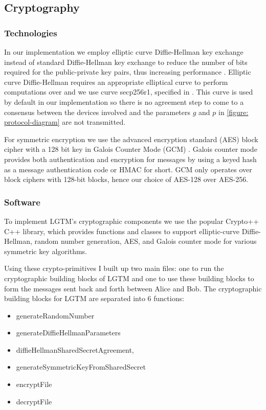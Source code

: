 \documentclass[12pt]{report}
\begin{document}
\subsection{Cryptography}
\subsubsection{Technologies}
In our implementation we employ elliptic curve Diffie-Hellman key exchange instead of standard Diffie-Hellman key exchange to reduce the number of bits required for the public-private key pairs, thus increasing performance \cite{FastEllipticCurveDiffieHellmanBernstein2006}. Elliptic curve Diffie-Hellman requires an appropriate elliptical curve to perform computations over and we use curve secp256r1, specified in \cite{EllipticCurvesStandard2009}. This curve is used by default in our implementation so there is no agreement step to come to a consensus between the devices involved and the parameters $g$ and $p$ in \ref{figure: protocol-diagram} are not transmitted. \par

For symmetric encryption we use the advanced encryption standard (AES) block cipher with a 128 bit key \cite{AesNist2001} in Galois Counter Mode (GCM) \cite{GcmModeMcGrewNist2005}. Galois counter mode provides both authentication and encryption for messages by using a keyed hash as a message authentication code or HMAC for short. GCM only operates over block ciphers with 128-bit blocks, hence our choice of AES-128 over AES-256. \par

\subsubsection{Software}
To implement LGTM's cryptographic components we use the popular Crypto++ C++ library, which provides functions and classes to support elliptic-curve Diffie-Hellman, random number generation, AES, and Galois counter mode for various symmetric key algorithms. \par

Using these crypto-primitives I built up two main files: one to run the cryptographic building blocks of LGTM and one to use these building blocks to form the messages sent back and forth between Alice and Bob. The cryptographic building blocks for LGTM are separated into 6 functions: 

\begin{itemize}
    \item generateRandomNumber
    \item generateDiffieHellmanParameters
    \item diffieHellmanSharedSecretAgreement, 
    \item generateSymmetricKeyFromSharedSecret
    \item encryptFile
    \item decryptFile
\end{itemize}
\end{document}
